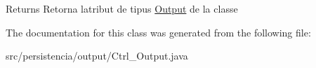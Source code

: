 \begin{DoxyReturn}{Returns}
Retorna l\textquotesingle{}atribut de tipus \hyperlink{classpersistencia_1_1output_1_1Output}{Output} de la classe 
\end{DoxyReturn}


The documentation for this class was generated from the following file\+:\begin{DoxyCompactItemize}
\item 
src/persistencia/output/Ctrl\+\_\+\+Output.\+java\end{DoxyCompactItemize}
